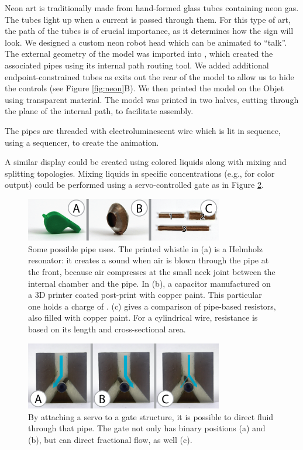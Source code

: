 Neon art is traditionally made from hand-formed glass tubes containing neon gas.  The tubes light up when a current is passed through them.  For this type of art, the path of the tubes is of crucial importance, as it determines how the sign will look.  We designed a custom neon robot head which can be animated to ``talk''. 
The external geometry of the model was imported into \systemnamenospace, which created the associated pipes using its internal path routing tool.  We added additional endpoint-constrained tubes as exits out the rear of the model to allow us to hide the controls (see Figure \ref{fig:neon}B).  We then printed the model on the Objet using transparent material. The model was printed in two halves, cutting through the plane of the internal path, to facilitate assembly. 

The pipes are threaded with electroluminescent wire which is lit in sequence, using a sequencer, to create the animation.

A similar display could be created using colored liquids along with mixing and splitting topologies.  Mixing liquids in specific concentrations (e.g., for color output) could be performed using a servo-controlled gate as in Figure \ref{fig:direct}.

\begin{figure}
\centering
    \includegraphics[width=3.4in]{figures/speculative.png}
\caption{Some possible pipe uses.  The printed whistle in (a) is a Helmholz resonator: it creates a sound when air is blown through the pipe at the front, because air compresses at the small neck joint between the internal chamber and the pipe.  In (b), a capacitor manufactured on a 3D printer coated post-print with copper paint.  This particular one holds a charge of .  (c) gives a comparison of pipe-based resistors, also filled with copper paint.  For a cylindrical wire, resistance is based on its length and cross-sectional area.}
\label{fig:speculative}
\end{figure}

\begin{figure}
\centering
    \includegraphics[width=3.4in]{figures/gates.png}
\caption{By attaching a servo to a gate structure, it is possible to direct fluid through that pipe.  The gate not only has binary positions (a) and (b), but can direct fractional flow, as well (c).}
\label{fig:direct}
\end{figure}
